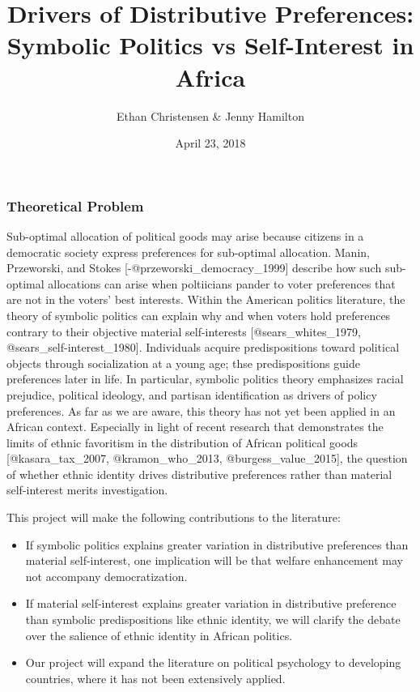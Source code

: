 \documentclass[]{article}
\title{Drivers of Distributive Preferences: Symbolic Politics vs Self-Interest
in Africa}
\author{Ethan Christensen \& Jenny Hamilton}
\date{April 23, 2018}
\begin{document}
\maketitle

\subsubsection{Theoretical Problem}\label{theoretical-problem}

Sub-optimal allocation of political goods may arise because citizens in
a democratic society express preferences for sub-optimal allocation.
Manin, Przeworski, and Stokes {[}-@przeworski\_democracy\_1999{]}
describe how such sub-optimal allocations can arise when poltiicians
pander to voter preferences that are not in the voters' best interests.
Within the American politics literature, the theory of symbolic politics
can explain why and when voters hold preferences contrary to their
objective material self-interests {[}@sears\_whites\_1979,
@sears\_self-interest\_1980{]}. Individuals acquire predispositions
toward political objects through socialization at a young age; thse
predispositions guide preferences later in life. In particular, symbolic
politics theory emphasizes racial prejudice, political ideology, and
partisan identification as drivers of policy preferences. As far as we
are aware, this theory has not yet been applied in an African context.
Especially in light of recent research that demonstrates the limits of
ethnic favoritism in the distribution of African political goods
{[}@kasara\_tax\_2007, @kramon\_who\_2013, @burgess\_value\_2015{]}, the
question of whether ethnic identity drives distributive preferences
rather than material self-interest merits investigation.

This project will make the following contributions to the literature:

\begin{itemize}
\item If symbolic politics explains greater variation in distributive preferences than material self-interest, one implication will be that welfare enhancement may not accompany democratization.
\item If material self-interest explains greater variation in distributive preference than symbolic predispositions like ethnic identity, we will clarify the debate over the salience of ethnic identity in African politics.
\item Our project will expand the literature on political psychology to developing countries, where it has not been extensively applied.
\end{itemize}
\end{document}
